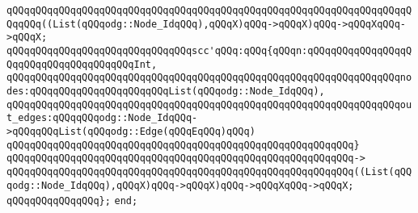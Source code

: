 \verb|qQQqqQQqqQQqqQQqqQQqqQQqqQQqqQQqqQQqqQQqqQQqqQQqqQQqqQQqqQQqqQQqqQQqqQQqqQQq((List(qQQqodg::Node_IdqQQq),qQQqX)qQQq->qQQqX)qQQq->qQQqXqQQq->qQQqX;|\newline
\newline
\verb|qQQqqQQqqQQqqQQqqQQqqQQqqQQqqQQqscc'qQQq:qQQq{qQQqn:qQQqqQQqqQQqqQQqqQQqqQQqqQQqqQQqqQQqqQQqInt,|\newline
\verb|qQQqqQQqqQQqqQQqqQQqqQQqqQQqqQQqqQQqqQQqqQQqqQQqqQQqqQQqqQQqqQQqqQQqnodes:qQQqqQQqqQQqqQQqqQQqqQQqList(qQQqodg::Node_IdqQQq),|\newline
\verb|qQQqqQQqqQQqqQQqqQQqqQQqqQQqqQQqqQQqqQQqqQQqqQQqqQQqqQQqqQQqqQQqqQQqout_edges:qQQqqQQqodg::Node_IdqQQq->qQQqqQQqList(qQQqodg::Edge(qQQqEqQQq)qQQq)|\newline
\verb|qQQqqQQqqQQqqQQqqQQqqQQqqQQqqQQqqQQqqQQqqQQqqQQqqQQqqQQqqQQq}|\newline
\verb|qQQqqQQqqQQqqQQqqQQqqQQqqQQqqQQqqQQqqQQqqQQqqQQqqQQqqQQqqQQq->|\newline
\verb|qQQqqQQqqQQqqQQqqQQqqQQqqQQqqQQqqQQqqQQqqQQqqQQqqQQqqQQqqQQq((List(qQQqodg::Node_IdqQQq),qQQqX)qQQq->qQQqX)qQQq->qQQqXqQQq->qQQqX;|\newline
\newline
\verb|qQQqqQQqqQQqqQQq};|\newline
\verb|end;|\newline

